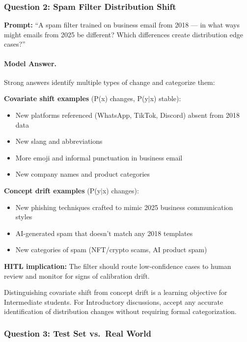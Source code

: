 \subsubsection{Question 2: Spam Filter Distribution Shift}

\textbf{Prompt:} ``A spam filter trained on business email from 2018 --- in what ways might emails from 2025 be different? Which differences create distribution edge cases?''

\paragraph{Model Answer.}

Strong answers identify multiple types of change and categorize them:

\textbf{Covariate shift examples} (P(x) changes, P(y$\mid$x) stable):
\begin{itemize}
    \item New platforms referenced (WhatsApp, TikTok, Discord) absent from 2018 data
    \item New slang and abbreviations
    \item More emoji and informal punctuation in business email
    \item New company names and product categories
\end{itemize}

\textbf{Concept drift examples} (P(y$\mid$x) changes):
\begin{itemize}
    \item New phishing techniques crafted to mimic 2025 business communication styles
    \item AI-generated spam that doesn't match any 2018 templates
    \item New categories of spam (NFT/crypto scams, AI product spam)
\end{itemize}

\textbf{HITL implication:} The filter should route low-confidence cases to human review and monitor for signs of calibration drift.

\begin{keyconcept}
Distinguishing covariate shift from concept drift is a learning objective for Intermediate students. For Introductory discussions, accept any accurate identification of distribution changes without requiring formal categorization.
\end{keyconcept}

\subsubsection{Question 3: Test Set vs.\ Real World}


